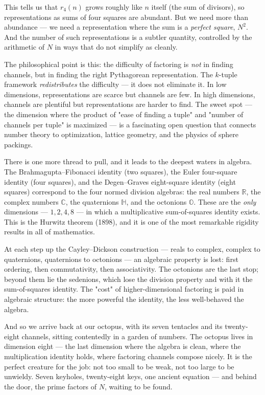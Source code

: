This tells us that $r_4(n)$ grows roughly like $n$ itself (the sum of divisors), so representations as sums of four squares are abundant. But we need more than abundance --- we need a representation where the sum is a \textit{perfect square}, $N^2$. And the number of such representations is a subtler quantity, controlled by the arithmetic of $N$ in ways that do not simplify as cleanly.

The philosophical point is this: the difficulty of factoring is \textit{not} in finding channels, but in finding the right Pythagorean representation. The $k$-tuple framework \textit{redistributes} the difficulty --- it does not eliminate it. In low dimensions, representations are scarce but channels are few. In high dimensions, channels are plentiful but representations are harder to find. The sweet spot --- the dimension where the product of "ease of finding a tuple" and "number of channels per tuple" is maximized --- is a fascinating open question that connects number theory to optimization, lattice geometry, and the physics of sphere packings.

There is one more thread to pull, and it leads to the deepest waters in algebra. The Brahmagupta--Fibonacci identity (two squares), the Euler four-square identity (four squares), and the Degen--Graves eight-square identity (eight squares) correspond to the four normed division algebras: the real numbers $\mathbb{R}$, the complex numbers $\mathbb{C}$, the quaternions $\mathbb{H}$, and the octonions $\mathbb{O}$. These are the \textit{only} dimensions --- $1, 2, 4, 8$ --- in which a multiplicative sum-of-squares identity exists. This is the Hurwitz theorem (1898), and it is one of the most remarkable rigidity results in all of mathematics.

At each step up the Cayley--Dickson construction --- reals to complex, complex to quaternions, quaternions to octonions --- an algebraic property is lost: first ordering, then commutativity, then associativity. The octonions are the last stop; beyond them lie the sedenions, which lose the division property and with it the sum-of-squares identity. The "cost" of higher-dimensional factoring is paid in algebraic structure: the more powerful the identity, the less well-behaved the algebra.

And so we arrive back at our octopus, with its seven tentacles and its twenty-eight channels, sitting contentedly in a garden of numbers. The octopus lives in dimension eight --- the last dimension where the algebra is clean, where the multiplication identity holds, where factoring channels compose nicely. It is the perfect creature for the job: not too small to be weak, not too large to be unwieldy. Seven keyholes, twenty-eight keys, one ancient equation --- and behind the door, the prime factors of $N$, waiting to be found.


